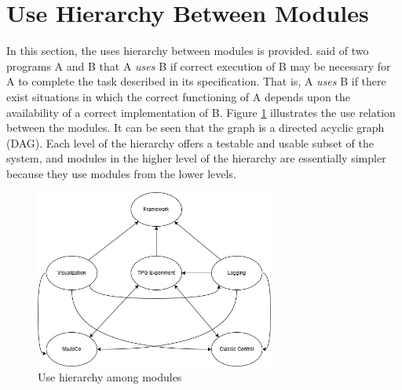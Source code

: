 \documentclass[12pt, titlepage]{article}
\begin{document}
\section{Use Hierarchy Between Modules} \label{SecUse}

In this section, the uses hierarchy between modules is
provided. \citet{Parnas1978} said of two programs A and B that A {\em uses} B if
correct execution of B may be necessary for A to complete the task described in
its specification. That is, A {\em uses} B if there exist situations in which
the correct functioning of A depends upon the availability of a correct
implementation of B.  Figure \ref{FigUH} illustrates the use relation between
the modules. It can be seen that the graph is a directed acyclic graph
(DAG). Each level of the hierarchy offers a testable and usable subset of the
system, and modules in the higher level of the hierarchy are essentially simpler
because they use modules from the lower levels.



\begin{figure}[H]
\centering
\includegraphics[width=0.7\textwidth]{use_hierarchy.png}
\caption{Use hierarchy among modules}
\label{FigUH}
\end{figure}

\end{document}
